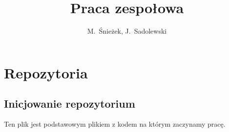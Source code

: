 \documentclass[twoside,12pt,a4paper]{report}
\author{M.~Śnieżek, J.~Sadolewski}
\title{Praca zespołowa}
\begin{document}
\maketitle

\chapter{Repozytoria}
\section{Inicjowanie repozytorium}
Ten plik jest podstawowym plikiem z kodem na którym zaczynamy pracę.
\end{document}

